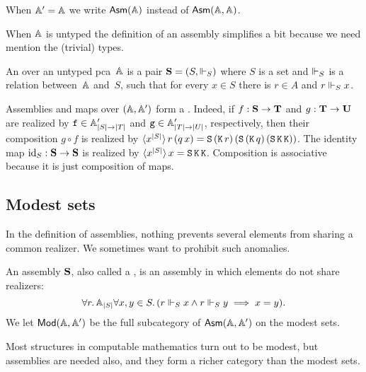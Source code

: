When $\subAA = \AA$ we write $\Asm{\AA}$ instead of $\Asm{\AA,\AA}$.

When $\AA$ is untyped the definition of an assembly simplifies a bit because we need mention the (trivial) types.

\begin{definition}
  An  over an untyped pca~$\AA$ is a pair $\asm{S} = (S, {\rz_S})$ where $S$ is a set and $\rz_S$ is a relation between~$\AA$ and~$S$, such that for every $x \in S$ there is $r \in A$ and $r \rz_S x$.
\end{definition}

Assemblies and maps over $(\AA, \subAA)$ form a .
%
Indeed, if $f : \asm{S} \to \asm{T}$ and $g : \asm{T} \to \asm{U}$ are realized by $\R{f} \in \subAtyp{|S| \to |T|}$
and $\R{g} \in \subAtyp{|T| \to |U|}$, respectively, then their composition $g \circ f$ is realized by
$\tpcalam{x}{|S|}{r\,(q\,x)} = \combS\,(\combK\,r)\,(\combS\,(\combK\,q)\,(\combS\,\combK\,\combK))$.
%
The identity map $\id[S] : \asm{S} \to \asm{S}$ is realized by $\tpcalam{x}{|S|}{x} = \combS\,\combK\,\combK$. 
%
Composition is associative because it is just composition of maps.

\subsection{Modest sets}
\label{sec:modest-sets}

In the definition of assemblies, nothing prevents several elements from sharing a common realizer. We sometimes want
to prohibit such anomalies.

\begin{definition}
  An  assembly $\asm{S}$, also called a , is an assembly in which elements do not share realizers:
  \begin{equation*}
    \all{r}{\xAtyp{S}}{
      \all{x,y \in S}
      (r \rz_S x \land r \rz_S y \implies x = y)
    }.
  \end{equation*}
  We let $\ModA$ be the full subcategory of $\AsmA$ on the modest sets.
\end{definition}

Most structures in computable mathematics turn out to be modest, but assemblies are needed also, and they form a richer category than the modest sets.

